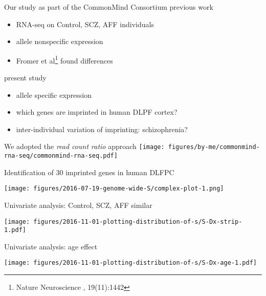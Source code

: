 \documentclass[usenames,dvipsnames]{beamer}
\begin{document}
\begin{frame}{Our study as part of the CommonMind Consortium}
previous work
\begin{itemize}
\item RNA-seq on Control, SCZ, AFF individuals
\item allele nonspecific expression 
\item Fromer et al\footnote{Nature Neuroscience , 19(11):1442} found
differences
\end{itemize}
\vfill

present study
\begin{itemize}
\item allele specific expression
\item which genes are imprinted in human DLPF cortex?
\item inter-individual variation of imprinting: schizophrenia?
\end{itemize} 
\end{frame}

\begin{frame}[label=cmc]{We adopted the \emph{read count ratio} approach}
\texttt{[image: figures/by-me/commonmind-rna-seq/commonmind-rna-seq.pdf]}
\end{frame}

\begin{frame}{Identification of 30 imprinted genes in human DLFPC}
\begin{center}
\texttt{[image: figures/2016-07-19-genome-wide-S/complex-plot-1.png]}
\end{center}
\end{frame}

\begin{frame}{Univariate analysis: Control, SCZ, AFF similar}
\begin{center}
\texttt{[image: figures/2016-11-01-plotting-distribution-of-s/S-Dx-strip-1.pdf]}
\end{center}
\end{frame}

\begin{frame}{Univariate analysis: age effect}
\begin{center}
\texttt{[image: figures/2016-11-01-plotting-distribution-of-s/S-Dx-age-1.pdf]}
\end{center}
\end{frame}
\end{document}
